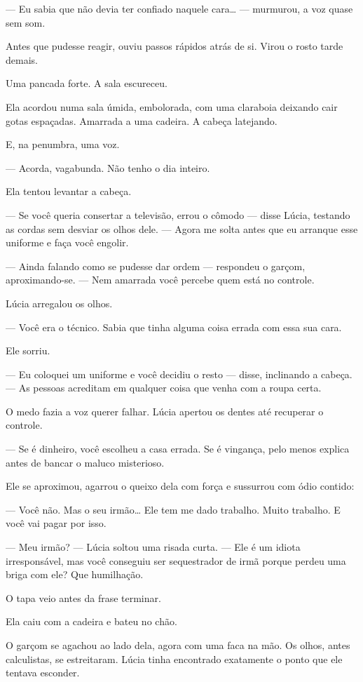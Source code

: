 — Eu sabia que não devia ter confiado naquele cara… — murmurou, a voz quase sem som.

Antes que pudesse reagir, ouviu passos rápidos atrás de si.  
Virou o rosto tarde demais.

Uma pancada forte.  
A sala escureceu.

\bigskip

Ela acordou numa sala úmida, embolorada, com uma claraboia deixando cair gotas espaçadas.  
Amarrada a uma cadeira.  
A cabeça latejando.

E, na penumbra, uma voz.

— Acorda, vagabunda. Não tenho o dia inteiro.

Ela tentou levantar a cabeça.

— Se você queria consertar a televisão, errou o cômodo — disse Lúcia, testando as cordas sem desviar os olhos dele. — Agora me solta antes que eu arranque esse uniforme e faça você engolir.

— Ainda falando como se pudesse dar ordem — respondeu o garçom, aproximando-se. — Nem amarrada você percebe quem está no controle.

Lúcia arregalou os olhos.

— Você era o técnico. Sabia que tinha alguma coisa errada com essa sua cara.

Ele sorriu.

— Eu coloquei um uniforme e você decidiu o resto — disse, inclinando a cabeça. — As pessoas acreditam em qualquer coisa que venha com a roupa certa.

O medo fazia a voz querer falhar. Lúcia apertou os dentes até recuperar o controle.

— Se é dinheiro, você escolheu a casa errada. Se é vingança, pelo menos explica antes de bancar o maluco misterioso.

Ele se aproximou, agarrou o queixo dela com força e sussurrou com ódio contido:

— Você não.  
Mas o seu irmão…  
Ele tem me dado trabalho.  
Muito trabalho.  
E você vai pagar por isso.

— Meu irmão? — Lúcia soltou uma risada curta. — Ele é um idiota irresponsável, mas você conseguiu ser sequestrador de irmã porque perdeu uma briga com ele? Que humilhação.

O tapa veio antes da frase terminar.

Ela caiu com a cadeira e bateu no chão.

O garçom se agachou ao lado dela, agora com uma faca na mão.  
Os olhos, antes calculistas, se estreitaram. Lúcia tinha encontrado exatamente o ponto que ele tentava esconder.

